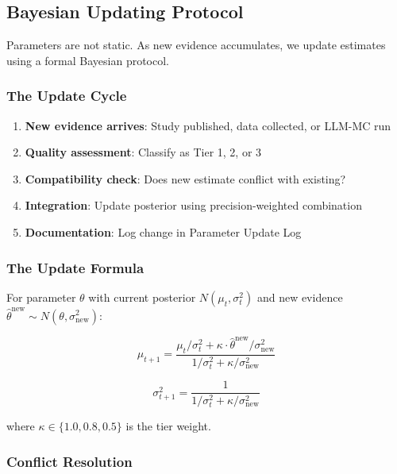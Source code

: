 \subsection{Bayesian Updating Protocol}
\label{sec:BBB-updating}

Parameters are not static. As new evidence accumulates, we update estimates 
using a formal Bayesian protocol.

\subsubsection{The Update Cycle}

\begin{enumerate}
    \item \textbf{New evidence arrives}: Study published, data collected, or LLM-MC run
    \item \textbf{Quality assessment}: Classify as Tier 1, 2, or 3
    \item \textbf{Compatibility check}: Does new estimate conflict with existing?
    \item \textbf{Integration}: Update posterior using precision-weighted combination
    \item \textbf{Documentation}: Log change in Parameter Update Log
\end{enumerate}

\subsubsection{The Update Formula}

For parameter $\theta$ with current posterior $N(\mu_t, \sigma_t^2)$ and new 
evidence $\hat{\theta}^{\text{new}} \sim N(\theta, \sigma^2_{\text{new}})$:

\begin{equation}
\mu_{t+1} = \frac{\mu_t / \sigma_t^2 + \kappa \cdot \hat{\theta}^{\text{new}} / \sigma^2_{\text{new}}}{1/\sigma_t^2 + \kappa / \sigma^2_{\text{new}}}
\end{equation}

\begin{equation}
\sigma^2_{t+1} = \frac{1}{1/\sigma_t^2 + \kappa / \sigma^2_{\text{new}}}
\end{equation}

where $\kappa \in \{1.0, 0.8, 0.5\}$ is the tier weight.

\subsubsection{Conflict Resolution}


